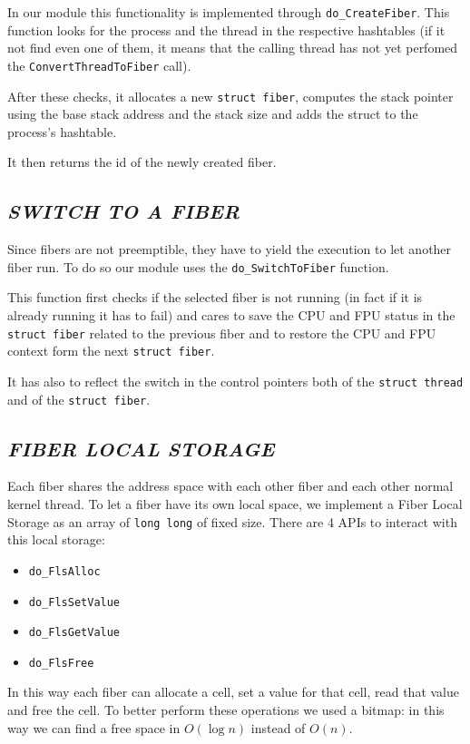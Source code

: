 \documentclass[a4paper]{article}
\begin{document}
In our module this functionality is implemented through \texttt{do\_CreateFiber}. This function looks for the process and the thread in the respective hashtables (if it not find even one of them, it means that the calling thread has not yet perfomed the \texttt{ConvertThreadToFiber} call).

After these checks, it allocates a new \texttt{struct fiber}, computes the stack pointer using the base stack address and the stack size and adds the struct to the process's hashtable.

It then returns the id of the newly created fiber.


\subsection*{\textit{SWITCH TO A FIBER}}
Since fibers are not preemptible, they have to yield the execution to let another fiber run. To do so our module uses the \texttt{do\_SwitchToFiber} function.

This function first checks if the selected fiber is not running (in fact if it is already running it has to fail) and cares to save the CPU and FPU status in the \texttt{struct fiber} related to the previous fiber and to restore the CPU and FPU context form the next \texttt{struct fiber}.

It has also to reflect the switch in the control pointers both of the \texttt{struct thread} and of the \texttt{struct fiber}.

\subsection*{\textit{FIBER LOCAL STORAGE}}
Each fiber shares the address space with each other fiber and each other normal kernel thread. To let a fiber have its own local space, we implement a Fiber Local Storage as an array of \texttt{long long} of fixed size. There are 4 APIs to interact with this local storage:

\begin{itemize}
  \item \texttt{do\_FlsAlloc}
  \item \texttt{do\_FlsSetValue}
  \item \texttt{do\_FlsGetValue}
  \item \texttt{do\_FlsFree}
\end{itemize}

In this way each fiber can allocate a cell, set a value for that cell, read that value and free the cell.
To better perform these operations we used a bitmap: in this way we can find a free space in $O(\log n)$ instead of $O(n)$.
\end{document}

